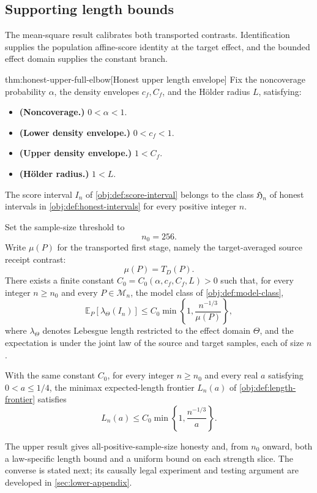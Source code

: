 \documentclass[11pt]{article}
\begin{document}
\subsection{Supporting length bounds}

The mean-square result calibrates both transported contrasts. Identification supplies the population affine-score identity at the target effect, and the bounded effect domain supplies the constant branch.

\begin{theoremv}{thm:honest-upper-full-elbow}[Honest upper length envelope]
Fix the noncoverage probability \(\alpha\), the density envelopes \(c_f,C_f\), and the Hölder radius \(L\), satisfying:
\begin{itemize}
\item \textbf{(Noncoverage.)} \(0<\alpha<1\).
\item \textbf{(Lower density envelope.)} \(0<c_f<1\).
\item \textbf{(Upper density envelope.)} \(1<C_f\).
\item \textbf{(Hölder radius.)} \(1<L\).
\end{itemize}
The score interval \(I_n\) of \cref{obj:def:score-interval} belongs to the class \(\mathfrak H_n\) of honest intervals in \cref{obj:def:honest-intervals} for every positive integer \(n\).

Set the sample-size threshold to
\[
n_0=256.
\]
Write \(\mu(P)\) for the transported first stage, namely the target-averaged source receipt contrast:
\[
\mu(P)=T_D(P).
\]
There exists a finite constant \(C_0=C_0(\alpha,c_f,C_f,L)>0\) such that, for every integer \(n\ge n_0\) and every \(P\in\mathcal M_n\), the model class of \cref{obj:def:model-class},
\[
\mathbb E_P\!\left[\lambda_{\Theta}(I_n)\right]
\le C_0\min\left\{1,\frac{n^{-1/3}}{\mu(P)}\right\},
\]
where \(\lambda_{\Theta}\) denotes Lebesgue length restricted to the effect domain \(\Theta\), and the expectation is under the joint law of the source and target samples, each of size \(n\).

With the same constant \(C_0\), for every integer \(n\ge n_0\) and every real \(a\) satisfying \(0<a\le 1/4\), the minimax expected-length frontier \(L_n(a)\) of \cref{obj:def:length-frontier} satisfies
\[
L_n(a)\le C_0\min\left\{1,\frac{n^{-1/3}}{a}\right\}.
\]
\end{theoremv}

The upper result gives all-positive-sample-size honesty and, from \(n_0\) onward, both a law-specific length bound and a uniform bound on each strength slice. The converse is stated next; its causally legal experiment and testing argument are developed in \cref{sec:lower-appendix}.
\end{document}
